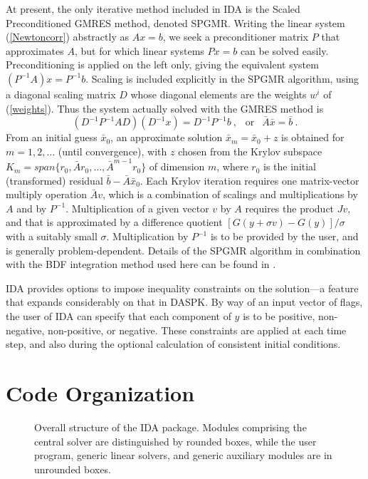 At present, the only iterative method included in IDA is the Scaled
Preconditioned GMRES method, denoted SPGMR.  Writing the linear system
(\ref{Newtoncorr}) abstractly as $A x = b$, we seek a preconditioner
matrix $P$ that approximates $A$, but for which linear systems 
$Px = b$ can be solved easily.  Preconditioning is applied on the left
only, giving the equivalent system $(P^{-1} A ) x = P^{-1} b$.
Scaling is included explicitly in the SPGMR algorithm, using a
diagonal scaling matrix $D$ whose diagonal elements are the weights
$w^i$ of (\ref{weights}).  Thus the system actually solved with the
GMRES method is
\begin{equation}
(D^{-1} P^{-1} A D ) (D^{-1} x) = D^{-1} P^{-1} b ~,~~
       \mbox{ or }~~  \bar{A} \bar{x} = \bar{b} ~.     \label{translinsys}
\end{equation}
From an initial guess $\bar{x}_0$, an approximate solution 
$\bar{x}_m = \bar{x}_0 + z$ is obtained for $m = 1, 2, \ldots$ 
(until convergence), with $z$ chosen from the Krylov subspace
$K_m = span\{r_0, \bar{A}r_0, \ldots, \bar{A}^{m-1}r_0\}$ 
of dimension $m$, where $r_0$ is the initial (transformed) residual 
$\bar{b} - \bar{A} \bar{x}_0$.  Each Krylov iteration requires one
matrix-vector multiply operation $\bar{A} v$, which is a combination
of scalings and multiplications by $A$ and by $P^{-1}$.
Multiplication of a given vector $v$ by $A$ requires the product $Jv$,
and that is approximated by a difference quotient 
$[G(y+\sigma v) - G(y)]/\sigma$ with a suitably small $\sigma$.
Multiplication by $P^{-1}$ is to be provided by the user, and is
generally problem-dependent.  Details of the SPGMR algorithm in
combination with the BDF integration method used here can be found in
\cite{BrHiPe94}.

IDA provides options to impose inequality constraints on the
solution---a feature that expands considerably on that in DASPK.  By
way of an input vector of flags, the user of IDA can specify that each
component of $y$ is to be positive, non-negative, non-positive, or
negative.  These constraints are applied at each time step, and also
during the optional calculation of consistent initial conditions.


\section{Code Organization}

\begin{figure}[p]
\vspace{0.8in}
\caption{Overall structure of the IDA package.
  Modules comprising the central solver are distinguished by rounded
  boxes, while the user program, generic linear solvers, and generic 
  auxiliary  modules are in unrounded boxes.} 
\label{idaorg}
\end{figure}

